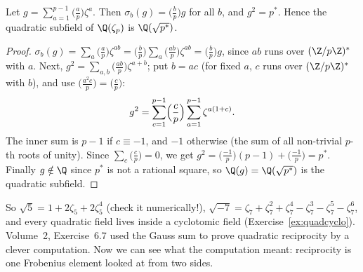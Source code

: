 \begin{proposition}\label{prop:gausssum}
Let $g=\sum_{a=1}^{p-1}\bigl(\frac ap\bigr)\zeta^a$. Then $\sigma_b(g)=\bigl(\frac bp\bigr)g$ for all $b$, and $g^2=p^*$.
Hence the quadratic subfield of $\Q(\zeta_p)$ is $\Q(\sqrt{p^*})$.
\end{proposition}
\begin{proof}
$\sigma_b(g)=\sum_a\bigl(\frac ap\bigr)\zeta^{ab}=\bigl(\frac bp\bigr)\sum_a\bigl(\frac{ab}p\bigr)\zeta^{ab}=\bigl(\frac bp
\bigr)g$, since $ab$ runs over $(\Z/p\Z)^*$ with $a$. Next, $g^2=\sum_{a,b}\bigl(\frac{ab}p\bigr)\zeta^{a+b}$; put $b=ac$
(for fixed $a$, $c$ runs over $(\Z/p\Z)^*$ with $b$), and use $\bigl(\frac{a^2c}p\bigr)=\bigl(\frac cp\bigr)$:
\[
g^2=\sum_{c=1}^{p-1}\Bigl(\frac cp\Bigr)\sum_{a=1}^{p-1}\zeta^{a(1+c)}.
\]
The inner sum is $p-1$ if $c\equiv-1$, and $-1$ otherwise (the sum of all non-trivial $p$-th roots of unity). Since
$\sum_c\bigl(\frac cp\bigr)=0$, we get $g^2=\bigl(\frac{-1}p\bigr)(p-1)+\bigl(\frac{-1}p\bigr)=p^*$. Finally $g\notin\Q$
since $p^*$ is not a rational square, so $\Q(g)=\Q(\sqrt{p^*})$ is the quadratic subfield.
\end{proof}

So $\sqrt5=1+2\zeta_5+2\zeta_5^4$ (check it numerically!), $\sqrt{-7}=\zeta_7+\zeta_7^2+\zeta_7^4-\zeta_7^3-\zeta_7^5-\zeta_7^6$,
and every quadratic field lives inside a cyclotomic field (Exercise~\ref{ex:quadcyclo}). Volume~2, Exercise~6.7 used the Gauss
sum to prove quadratic reciprocity by a clever computation. Now we can see what the computation meant: reciprocity is one
Frobenius element looked at from two sides.

